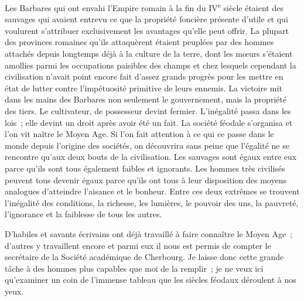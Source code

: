 \documentclass[twoside]{book} %
\newcommand{\astermono}{\medskip\centerline{\color{rubric}\large\selectfont{\syms ✻}}\medskip\par}%
\begin{document}
Les Barbares qui ont envahi l’Empire romain à la fin du IV\textsuperscript{e} siècle étaient des sauvages qui avaient entrevu ce que la propriété foncière présente d’utile et qui voulurent s’attribuer exclusivement les avantages qu’elle peut offrir. La plupart des provinces romaines qu’ils attaquèrent étaient peuplées par des hommes attachés depuis longtemps déjà à la culture de la terre, dont les mœurs s’étaient amollies parmi les occupations paisibles des champs et chez lesquels cependant la civilisation n’avait point encore fait d’assez grands progrès pour les mettre en état de lutter contre l’impétuosité primitive de leurs ennemis. La victoire mit dans les mains des Barbares non seulement le gouvernement, mais la propriété des tiers. Le cultivateur, de possesseur devint fermier. L'inégalité passa dans les lois ; elle devint un droit après avoir été un fait. La société féodale s’organisa et l’on vit naître le Moyen Age. Si l’on fait attention à ce qui ce passe dans le monde depuis l’origine des sociétés, on découvrira sans peine que l’égalité ne se rencontre qu’aux deux bouts de la civilisation. Les sauvages sont égaux entre eux parce qu’ils sont tous également faibles et ignorants. Les hommes très civilisés peuvent tous devenir égaux parce qu’ils ont tous à leur disposition des moyens analogues d’atteindre l’aisance et le bonheur. Entre ces deux extrêmes se trouvent l’inégalité des conditions, la richesse, les lumières, le pouvoir des uns, la pauvreté, l’ignorance et la faiblesse de tous les autres.\par
D'habiles et savants écrivains ont déjà travaillé à faire connaître le Moyen Age ; d’autres y travaillent encore et parmi eux il nous est permis de compter le secrétaire de la Société académique de Cherbourg. Je laisse donc cette grande tâche à des hommes plus capables que moi de la remplir ; je ne veux ici qu’examiner un coin de l’immense tableau que les siècles féodaux déroulent à nos yeux.\par

\astermono
\end{document}

